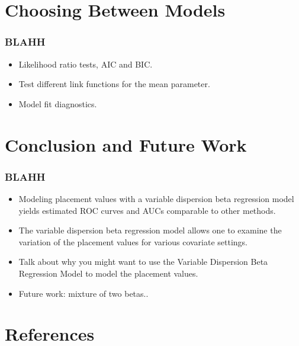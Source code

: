 \documentclass[t]{beamer}
\begin{document}
\section{Choosing Between Models}

\begin{frame}
	\frametitle{BLAHH}
	\begin{itemize}
		\item Likelihood ratio tests, AIC and BIC.
		\item Test different link functions for the mean parameter.
		\item Model fit diagnostics.
	\end{itemize}
\end{frame}


\section{Conclusion and Future Work}

\begin{frame}
	\frametitle{BLAHH}
	\begin{itemize}
		\item Modeling placement values with a variable dispersion beta regression model yields estimated ROC curves and AUCs comparable to other methods.
		\item The variable dispersion beta regression model allows one to examine the variation of the placement values for various covariate settings.
		\item Talk about why you might want to use the Variable Dispersion Beta Regression Model to model the placement values.
		\item Future work: mixture of two betas..
	\end{itemize}
\end{frame}

\section{References}
\end{document}
